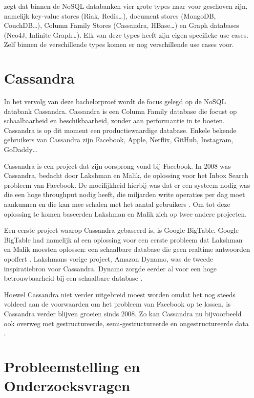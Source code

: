 \cite{Sadalage2014OverviewNoSQL} zegt dat binnen de NoSQL databanken vier grote types naar voor geschoven zijn, namelijk key-value stores (Riak, Redis\dots), document stores (MongoDB, CouchDB\dots), Column Family Stores (Cassandra, HBase\dots) en Graph databases (Neo4J, Infinite Graph\dots).
Elk van deze types heeft zijn eigen specifieke use cases.
Zelf binnen de verschillende types komen er nog verschillende use cases voor.

\section{Cassandra}

In het vervolg van deze bachelorproef wordt de focus gelegd op de NoSQL databank Cassandra.
Cassandra is een Column Family database die focust op schaalbaarheid en beschikbaarheid, zonder aan performantie in te boeten.
Cassandra is op dit moment een productiewaardige database.
Enkele bekende gebruikers van Cassandra zijn Facebook, Apple, Netflix, GitHub, Instagram, GoDaddy\dots

Cassandra is een project dat zijn oorsprong vond bij Facebook.
In 2008 was Cassandra, bedacht door Lakshman en Malik, de oplossing voor het Inbox Search probleem van Facebook.
De moeilijkheid hierbij was dat er een systeem nodig was die een hoge throughput nodig heeft, die miljarden write operaties per dag moet aankunnen en die kan mee schalen met het aantal gebruikers \citep{lakshman2010cassandra}.
Om tot deze oplossing te komen baseerden Lakshman en Malik zich op twee andere projecten.

Een eerste project waarop Cassandra gebaseerd is, is Google BigTable.
Google BigTable had namelijk al een oplossing voor een eerste probleem dat Lakshman en Malik moesten oplossen: een schaalbare database die geen realtime antwoorden opoffert \citep{chang2008bigtable}.
Lakshmans vorige project, Amazon Dynamo, was de tweede inspiratiebron voor Cassandra.
Dynamo zorgde eerder al voor een hoge betrouwbaarheid bij een schaalbare database \citep{decandia2007dynamo}.

Hoewel Cassandra niet verder uitgebreid moest worden omdat het nog steeds voldeed aan de voorwaarden om het probleem van Facebook op te lossen, is Cassandra verder blijven groeien sinds 2008.
Zo kan Cassandra nu bijvoorbeeld ook overweg met gestructureerde, semi-gestructureerde en ongestructureerde data \citep{kan2014cassandra}.

\section{Probleemstelling en Onderzoeksvragen}
\label{sec:onderzoeksvragen}

